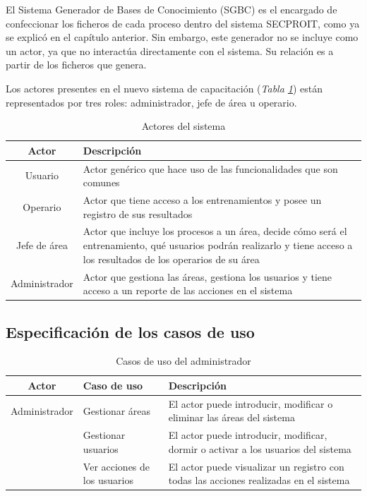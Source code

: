 El Sistema Generador de Bases de Conocimiento (SGBC) es el encargado de confeccionar los ficheros de cada proceso dentro del sistema SECPROIT, como ya se explicó en el capítulo anterior. Sin embargo, este generador no se incluye como un actor, ya que no interactúa directamente con el sistema. Su relación es a partir de los ficheros que genera.

Los actores presentes en el nuevo sistema de capacitación (\textsl{Tabla \ref{tab:actores}}) están representados por tres roles: administrador, jefe de área u operario.

\begin{table}[H]
\begin{center}
\begin{tabular}{ | c | p{11cm} | }
\hline
\textbf{Actor} & \textbf{Descripción} \\
\hline
Usuario & Actor genérico que hace uso de las funcionalidades que son comunes \\
\hline
Operario & Actor que tiene acceso a los entrenamientos y posee un registro de sus resultados \\
\hline
Jefe de área & Actor que incluye los procesos a un área, decide cómo será el entrenamiento, qué usuarios podrán realizarlo y tiene acceso a los resultados de los operarios de su área \\
\hline
Administrador & Actor que gestiona las áreas, gestiona los usuarios y tiene acceso a un reporte de las acciones en el sistema \\
\hline
\end{tabular}
\caption{Actores del sistema}
\label{tab:actores}
\end{center}
\end{table}

\subsection{Especificación de los casos de uso}

\begin{table}[H]
\begin{center}
\begin{tabular}{ | c | p{3.5cm} |  p{7.5cm} |}
\hline
\textbf{Actor} & \textbf{Caso de uso} & \textbf{Descripción}\\
\hline
Administrador & Gestionar áreas & El actor puede introducir, modificar o eliminar las áreas del sistema \\
\cline{2-3}
& Gestionar usuarios & El actor puede introducir, modificar, dormir o activar a los usuarios del sistema \\
\cline{2-3}
& Ver acciones de los usuarios & El actor puede visualizar un registro con todas las acciones realizadas en el sistema \\
\hline
\end{tabular}
\caption{Casos de uso del administrador}
\end{center}
\end{table}

